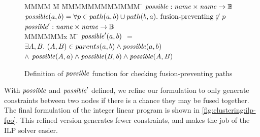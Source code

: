 \begin{figure}
\begin{tabbing}
MMMM \= M \=     \= MMMMMMMMMMMM    \=  \kill
$\mathit{possible} : \mathit{name} \times \mathit{name} \to \mathbb{B}$ \\
$\mathit{possible}(a,b) = \forall p \in path(a,b) \cup path(b,a).\ \mbox{fusion-preventing} \not\in p$
\\[1ex]
$\mathit{possible}' : \mathit{name} \times \mathit{name} \to \mathbb{B}$ \\
MMMMMMx        \= M    \= \kill
$\mathit{possible}'(a,b)$ 
        \> $=$   \>$\exists A, B.\ (A,B) \in parents(a,b) \wedge \mathit{possible}(a,b)$ \\
        \> $\wedge$ \> $\mathit{possible}(A,a) \wedge \mathit{possible}(B,b) \wedge \mathit{possible}(A,B)$
\end{tabbing}
\caption{Definition of $\mathit{possible}$ function for checking fusion-preventing paths}
\label{fig:clustering:possible}
\end{figure}

With $\mathit{possible}$ and $\mathit{possible}'$ defined, we refine our formulation to only generate constraints between two nodes if there is a chance they may be fused together.
The final formulation of the integer linear program is shown in \cref{fig:clustering:ilp-fpo}.
This refined version generates fewer constraints, and makes the job of the ILP solver easier.

